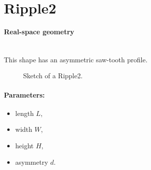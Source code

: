 \newpage
\section{Ripple2}   

\paragraph{Real-space geometry}\mbox{}\\
This shape has an asymmetric saw-tooth profile.

\begin{figure}[ht]
\hfill
{}
\hfill
{}
\hfill
\caption{Sketch of a Ripple2.}
\label{fig:ripple2}
\end{figure}

\FloatBarrier

\paragraph{Parameters:}
\begin{itemize}
\item length $L$, 
\item width $W$, 
\item height $H$,
\item asymmetry $d$. 
\end{itemize}

